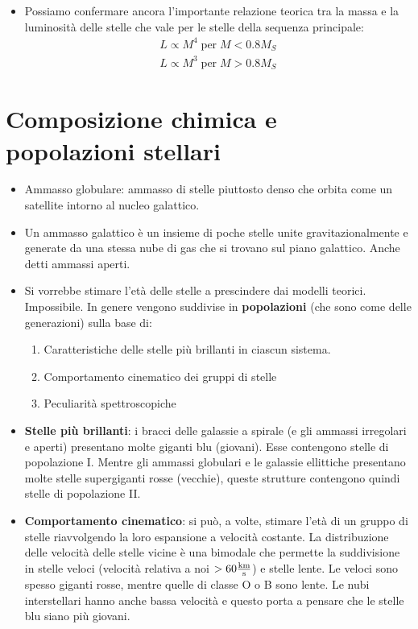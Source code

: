 \documentclass[11pt,a4paper]{article}
\begin{document}
\begin{itemize}
\item Possiamo confermare ancora l'importante relazione teorica tra la massa e la luminosità delle stelle che vale per le stelle della sequenza principale:
\begin{align}
L \propto M^4 \; \text{per} \; M < 0.8 M_{S} \\
L \propto M^3 \; \text{per} \;  M > 0.8 M_{S} 
\end{align}

\end{itemize}

\section{Composizione chimica e popolazioni stellari}

\begin{itemize}

\item Ammasso globulare: ammasso di stelle piuttosto denso che orbita come un satellite intorno al nucleo galattico.

\item Un ammasso galattico è un insieme di poche stelle unite gravitazionalmente e generate da una stessa nube di gas che si trovano sul piano galattico. Anche detti ammassi aperti.

\item Si vorrebbe stimare l'età delle stelle a prescindere dai modelli teorici. Impossibile. In genere vengono suddivise in \textbf{popolazioni} (che sono come delle generazioni) sulla base di:
\begin{enumerate}
\item Caratteristiche delle stelle più brillanti in ciascun sistema.
\item Comportamento cinematico dei gruppi di stelle
\item Peculiarità spettroscopiche
\end{enumerate}

\item \textbf{Stelle più brillanti}: i bracci delle galassie a spirale  (e gli ammassi irregolari e aperti) presentano molte giganti blu (giovani). Esse contengono stelle di popolazione I. Mentre gli ammassi globulari e le galassie ellittiche presentano molte stelle supergiganti rosse (vecchie), queste strutture contengono quindi stelle di popolazione II.

\item \textbf{Comportamento cinematico}: si può, a volte, stimare l'età di un gruppo di stelle riavvolgendo la loro espansione a velocità costante.
La distribuzione delle velocità delle stelle vicine è una bimodale che permette la suddivisione in stelle veloci (velocità relativa a noi $ > 60 \si{\frac{k \meter}{\second}}$) e stelle lente. Le veloci sono spesso giganti rosse, mentre quelle di classe O o B sono lente. Le nubi interstellari hanno anche bassa velocità e questo porta a pensare che le stelle blu siano più giovani.


\end{itemize}
\end{document}
